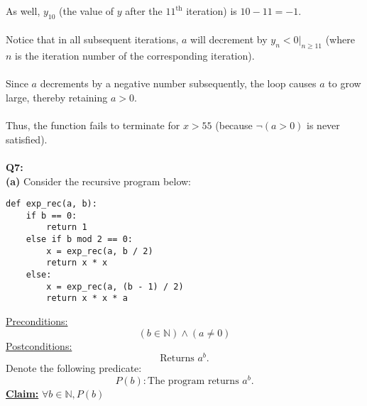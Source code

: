 \documentclass[12pt]{article}
\begin{document}
As well, $y_{10}$ (the value of $y$ after the $11^{\text{th}}$ iteration) is $10 - 11 = -1$. \\
\\
Notice that in all subsequent iterations, $a$ will decrement by $y_n < 0 |_{n \geq 11}$ (where $n$ is the iteration number of the corresponding iteration). \\
\\
Since $a$ decrements by a negative number subsequently, the loop causes $a$ to grow large, thereby retaining $a > 0$. \\
\\
Thus, the function fails to terminate for $x > 55$ (because $\neg (a > 0)$ is never satisfied). \\
\\
\textbf{Q7:} \\
\textbf{(a)} Consider the recursive program below:
\begin{lstlisting}
def exp_rec(a, b):
    if b == 0:
        return 1
    else if b mod 2 == 0:
        x = exp_rec(a, b / 2)
        return x * x
    else:
        x = exp_rec(a, (b - 1) / 2)
        return x * x * a
\end{lstlisting}
\underline{Preconditions:}
\[
    (b \in \mathbb{N}) \land (a \neq 0)
\]
\underline{Postconditions:}
\[
    \text{Returns } a^b \text{.}
\]
Denote the following predicate:
\[P(b): \text{The program returns } a^b \text{.}\]
\textbf{\underline{Claim:}} \(\forall b \in \mathbb{N}, P(b)\) 
\end{document}
